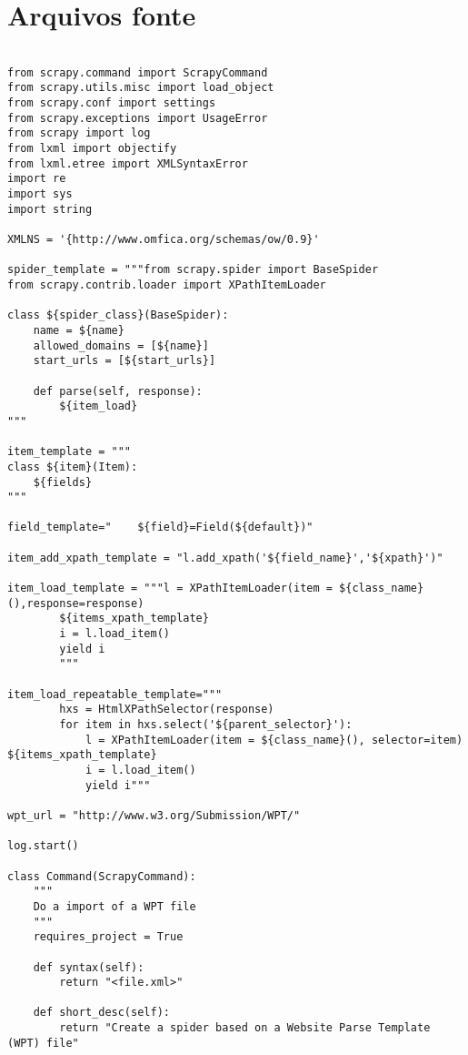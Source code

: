 \appendix
\chapter{Arquivos fonte}
\thispagestyle{fancy}

\begin{lstlisting}

from scrapy.command import ScrapyCommand
from scrapy.utils.misc import load_object
from scrapy.conf import settings
from scrapy.exceptions import UsageError
from scrapy import log
from lxml import objectify
from lxml.etree import XMLSyntaxError
import re
import sys
import string

XMLNS = '{http://www.omfica.org/schemas/ow/0.9}' 

spider_template = """from scrapy.spider import BaseSpider
from scrapy.contrib.loader import XPathItemLoader

class ${spider_class}(BaseSpider):
    name = ${name}
    allowed_domains = [${name}]
    start_urls = [${start_urls}]

    def parse(self, response):
        ${item_load}
"""

item_template = """
class ${item}(Item):
    ${fields}
"""

field_template="    ${field}=Field(${default})"

item_add_xpath_template = "l.add_xpath('${field_name}','${xpath}')"

item_load_template = """l = XPathItemLoader(item = ${class_name}(),response=response)
        ${items_xpath_template} 
        i = l.load_item()
        yield i
        """

item_load_repeatable_template="""
        hxs = HtmlXPathSelector(response)
        for item in hxs.select('${parent_selector}'):
            l = XPathItemLoader(item = ${class_name}(), selector=item)
${items_xpath_template}
            i = l.load_item()
            yield i"""

wpt_url = "http://www.w3.org/Submission/WPT/"

log.start()

class Command(ScrapyCommand):
    """
    Do a import of a WPT file 
    """
    requires_project = True

    def syntax(self):
        return "<file.xml>"

    def short_desc(self):
        return "Create a spider based on a Website Parse Template (WPT) file"


\end{lstlisting}
